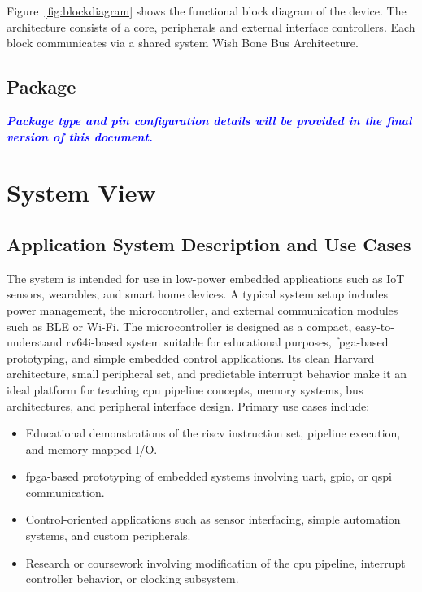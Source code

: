 \begin{itemize}
            Figure~\ref{fig:blockdiagram} shows the functional block diagram of the device.
            The architecture consists of a core, peripherals and external interface
            controllers. Each block communicates via a shared system Wish Bone Bus
            Architecture.

            \subsection{Package}

            \textcolor{blue}{\textbf{\textit{Package type and pin configuration details will be provided in the final version of this document.}}}

            \section{System View}

            \subsection{Application System Description and Use Cases}
            The system is intended for use in low-power embedded applications such as IoT
            sensors, wearables, and smart home devices. A typical system setup includes
            power management, the microcontroller, and external communication modules such
            as BLE or Wi-Fi. The microcontroller is designed as a compact,
            easy-to-understand \gls{rv64i}-based system suitable for educational purposes,
            \gls{fpga}-based prototyping, and simple embedded control applications. Its
            clean \gls{Harvard} architecture, small peripheral set, and predictable
            interrupt behavior make it an ideal platform for teaching \gls{cpu}
            \gls{pipeline} concepts, memory systems, bus architectures, and peripheral
            interface design. Primary use cases include:
            \begin{itemize}
                  \item Educational demonstrations of the \gls{riscv} instruction set, \gls{pipeline}
                        execution, and memory-mapped I/O.
                  \item \gls{fpga}-based prototyping of embedded systems involving \gls{uart}, \gls{gpio}, or \gls{qspi} communication.
                  \item Control-oriented applications such as sensor interfacing, simple automation
                        systems, and custom peripherals.
                  \item Research or coursework involving modification of the \gls{cpu} \gls{pipeline},
                        interrupt controller behavior, or clocking subsystem.
            \end{itemize}


\end{itemize}
